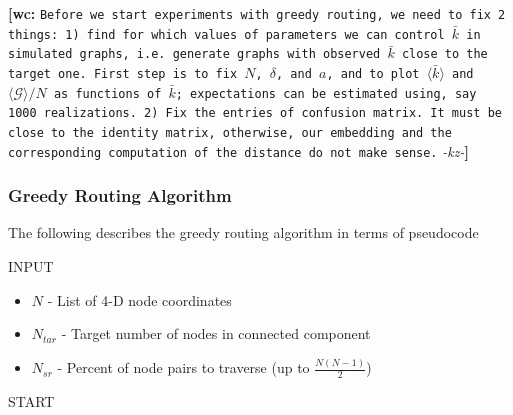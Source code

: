 \documentclass[preprint,notitlepage,amsmath,amssymb,floatfix]{revtex4-1}
\newcommand{\XXX}[3]{{\bf [#1: } {\tt #3} {\it -#2-}{\bf ]}}
\begin{document}
\XXX{wc}{kz}{Before we start experiments with greedy routing, we need to fix 2 things: 1) find for which values of parameters we can control $\bar{k}$ in simulated graphs, i.e. generate graphs with observed $\bar{k}$ close to the target one. First step is to fix $N$, $\delta$, and $a$, and to plot $\langle\bar{k}\rangle$ and $\langle\mathcal{G}\rangle/N$ as functions of $\bar{k}$; expectations can be estimated using, say 1000 realizations. 2) Fix the entries of confusion matrix. It must be close to the identity matrix, otherwise, our embedding and the corresponding computation of the distance do not make sense.}

\subsubsection{Greedy Routing Algorithm}
The following describes the greedy routing algorithm in terms of pseudocode
\begin{description}
  \item[INPUT]
\end{description}
\begin{itemize}[leftmargin=*]
  \item $N$ - List of 4-D node coordinates
  \item $N_{tar}$ - Target number of nodes in connected component
  \item $N_{sr}$ - Percent of node pairs to traverse (up to $\frac{N(N-1)}{2}$)
\end{itemize}
\begin{description}
  \item[START]
\end{description}
\end{document}
